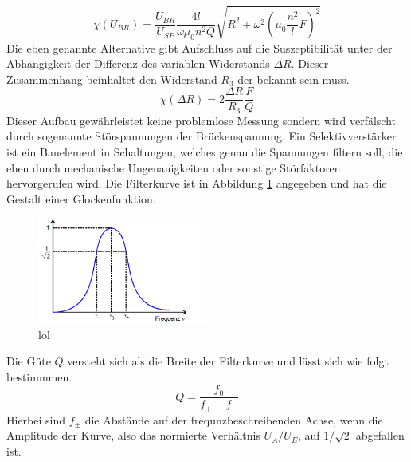 \begin{equation}
    \label{eqn:werdasliestistOMEGAdummXD}
    \chi(U_{BR})= \frac{U_{BR}}{U_{SP}} \frac{4l}{\omega \mu_0 n^2 Q} \sqrt{R^2+\omega^2 \left( \mu_0 \frac{n^2}{l}F \right)^2}
\end{equation}
Die eben genannte Alternative gibt Aufschluss auf die Suszeptibilität unter der Abhängigkeit der Differenz des variablen Widerstands %
$\Delta R$. Dieser Zusammenhang beinhaltet den Widerstand $R_3$ der bekannt sein muss.
\begin{equation}
    \label{eqn:werdasliestistOMEGAundGIGAdummXD}
    \chi(\Delta R) = 2 \frac{\Delta R}{R_3}\frac{F}{Q}
\end{equation}
Dieser Aufbau gewährleistet keine problemlose Messung sondern wird verfälscht durch sogenannte Störspannungen der Brückenspannung.
Ein Selektivverstärker ist ein Bauelement in Schaltungen, welches genau die Spannungen filtern soll, die eben durch mechanische Ungenauigkeiten 
oder sonstige Störfaktoren hervorgerufen wird. Die Filterkurve ist in Abbildung \ref{fig:glocke} angegeben und hat die Gestalt einer Glockenfunktion.
\begin{figure}
    \centering
    \includegraphics[width=0.5\textwidth]{bilder/glocke.png}
    \caption{lol}
    \label{fig:glocke}
\end{figure}
Die Güte $Q$ versteht sich als die Breite der Filterkurve und lässt sich wie folgt bestimmmen.
\begin{equation}
    \label{eq:achduliebeGüte}    
    Q= \frac{f_0}{f_+ - f_-}
\end{equation}
Hierbei sind $f_{\pm}$ die Abstände auf der frequnzbeschreibenden Achse, wenn die Amplitude der Kurve, also das normierte Verhältnis $U_A/U_E$,
auf $1/\sqrt{2}$ abgefallen ist.